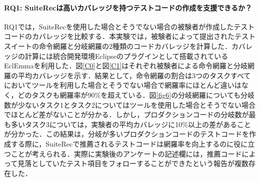 \documentclass[12pt]{jarticle} %
\begin{document}

\paragraph{RQ1: {\sf SuiteRec}は高いカバレッジを持つテストコードの作成を支援できるか？}RQ1では，{\sf SuiteRec}を使用した場合とそうでない場合の被験者が作成したテストコードのカバレッジを比較する．本実験では，被験者によって提出されたテストスイートの命令網羅と分岐網羅の2種類のコードカバレッジを計算した．カバレッジの計算には統合開発環境Eclipse\cite{b21}のプラグインとして搭載されているEclEmma\cite{b11}を利用した．図\ref{C0}と図\ref{C1}はそれぞれ被験者による命令網羅と分岐網羅の平均カバレッジを示す．結果として，命令網羅の割合は3つのタスクすべてにおいてツールを利用した場合とそうでない場合で網羅率にほとんど違いはなく，どのタスクも網羅率が90\%を超えている．図\ref{fig6}の分岐網羅についても分岐数が少ないタスク1とタスク2についてはツールを使用した場合とそうでない場合でほとんど差がないことが分かる．しかし，プロダクションコードの分岐数が最も多いタスク3については，実験者の平均カバレッジに10\%以上の差があることが分かった．この結果は，分岐が多いプロダクションコードのテストコードを作成する際に，{\sf SuiteRec}で推薦されるテストコードは網羅率を向上するのに役に立つことが考えられる．実際に実験後のアンケートの記述欄には，推薦コードによって見落としていたテスト項目をフォローすることができたという報告が複数存在した．
\end{document}
